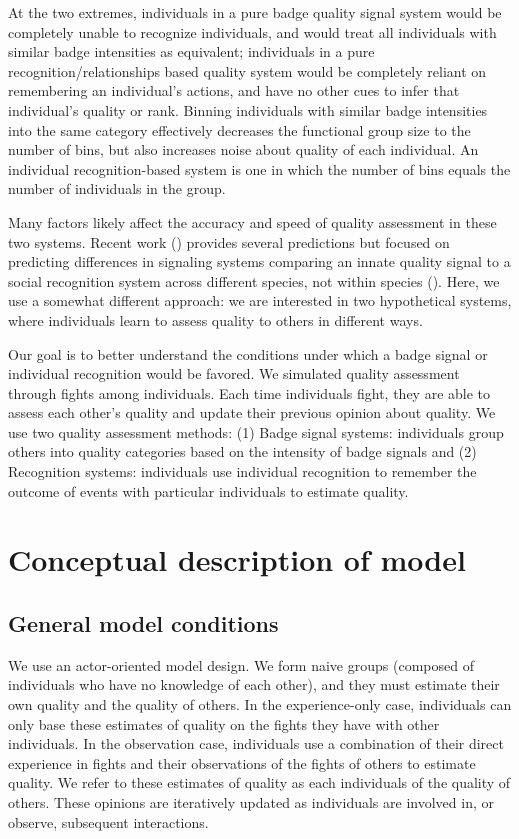At the two extremes, individuals in a pure badge quality signal system would be completely unable to recognize individuals, and would treat all individuals with similar badge intensities as equivalent; individuals in a pure recognition/relationships based quality system would be completely reliant on remembering an individual's actions, and have no other cues to infer that individual's quality or rank. Binning individuals with similar badge intensities into the same category effectively decreases the functional group size to the number of bins, but also increases noise about quality of each individual. An individual recognition-based system is one in which the number of bins equals the number of individuals in the group.  

Many factors likely affect the accuracy and speed of quality assessment in these two systems. Recent work (\cite{sheehan2016evotradeoff}) provides several predictions but focused on predicting differences in signaling systems comparing an innate quality signal to a social recognition system across different species, not within species (\cite{sheehan2016response}). Here, we use a somewhat different approach: we are interested in two hypothetical systems, where individuals learn to assess quality to others in different ways. 

Our goal is to better understand the conditions under which a badge signal or individual recognition would be favored. We simulated quality assessment through fights among individuals. Each time individuals fight, they are able to assess each other's quality and update their previous opinion about quality. We use two quality assessment methods: (1) Badge signal systems: individuals group others into quality categories based on the intensity of badge signals and (2) Recognition systems: individuals use individual recognition to remember the outcome of events with particular individuals to estimate quality. 

\section*{Conceptual description of model} 

\subsection*{General model conditions}
We use an actor-oriented model design. We form naive groups (composed of individuals who have no knowledge of each other), and they must estimate their own quality and the quality of others. In the experience-only case, individuals can only base these estimates of quality on the fights they have with other individuals. In the observation case, individuals use a combination of their direct experience in fights and their observations of the fights of others to estimate quality. We refer to these estimates of quality as each individuals  of the quality of others. These opinions are iteratively updated as individuals are involved in, or observe, subsequent interactions. 

